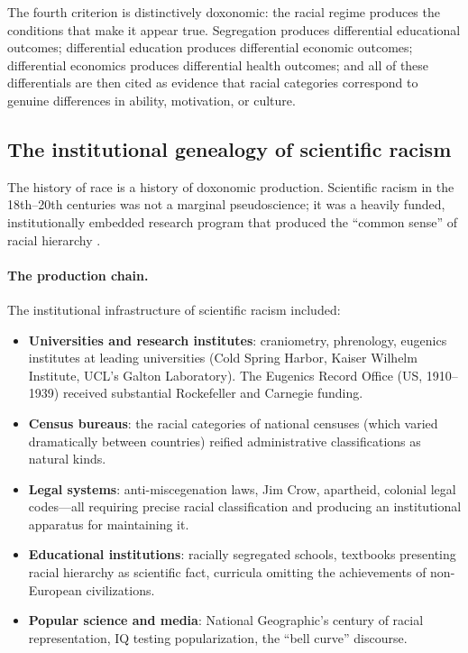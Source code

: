 The fourth criterion is distinctively doxonomic: the racial regime produces the conditions that make it appear true.
Segregation produces differential educational outcomes; differential education produces differential economic outcomes; differential economics produces differential health outcomes; and all of these differentials are then cited as evidence that racial categories correspond to genuine differences in ability, motivation, or culture.

\subsection{The institutional genealogy of scientific racism}

The history of race is a history of doxonomic production.
Scientific racism in the 18th--20th centuries was not a marginal pseudoscience; it was a heavily funded, institutionally embedded research program that produced the ``common sense'' of racial hierarchy \autocite{dubois1903}.

\paragraph{The production chain.}
The institutional infrastructure of scientific racism included:
\begin{itemize}[nosep]
  \item \textbf{Universities and research institutes}: craniometry, phrenology, eugenics institutes at leading universities (Cold Spring Harbor, Kaiser Wilhelm Institute, UCL's Galton Laboratory). The Eugenics Record Office (US, 1910--1939) received substantial Rockefeller and Carnegie funding.
  \item \textbf{Census bureaus}: the racial categories of national censuses (which varied dramatically between countries) reified administrative classifications as natural kinds.
  \item \textbf{Legal systems}: anti-miscegenation laws, Jim Crow, apartheid, colonial legal codes---all requiring precise racial classification and producing an institutional apparatus for maintaining it.
  \item \textbf{Educational institutions}: racially segregated schools, textbooks presenting racial hierarchy as scientific fact, curricula omitting the achievements of non-European civilizations.
  \item \textbf{Popular science and media}: National Geographic's century of racial representation, IQ testing popularization, the ``bell curve'' discourse.
\end{itemize}

